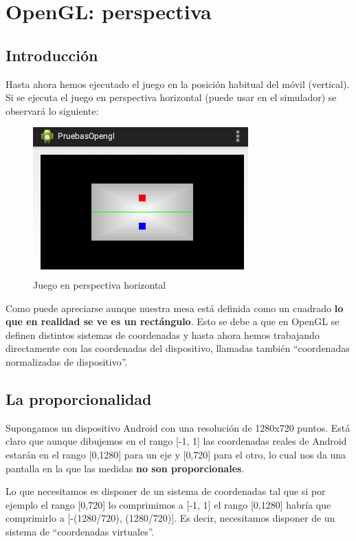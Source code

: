 \documentclass[a4paper,12pt,spanish]{sphinxmanual}
\begin{document}
\chapter{OpenGL: perspectiva}
\label{cap5opengl::doc}\label{cap5opengl:opengl-perspectiva}

\section{Introducción}
\label{cap5opengl:introduccion}
Hasta ahora hemos ejecutado el juego en la posición habitual del móvil (vertical). Si se ejecuta el juego en perspectiva horizontal (puede usar  en el simulador) se observará lo siguiente:
\begin{figure}[htbp]
\centering
\capstart

\includegraphics{juegohorizontal.png}
\caption{Juego en perspectiva horizontal}\end{figure}

Como puede apreciarse aunque nuestra mesa está definida como un cuadrado \textbf{lo que en realidad se ve es un rectángulo}. Esto se debe a que en OpenGL se definen distintos sistemas de coordenadas y hasta ahora hemos trabajando directamente con las coordenadas del dispositivo, llamadas también ``coordenadas normalizadas de dispositivo''.


\section{La proporcionalidad}
\label{cap5opengl:la-proporcionalidad}
Supongamos un dispositivo Android con una resolución de 1280x720 puntos. Está claro que aunque dibujemos en el rango {[}-1, 1{]} las coordenadas reales de Android estarán en el rango  {[}0,1280{]} para un eje y {[}0,720{]} para el otro, lo cual nos da una pantalla en la que las medidas \textbf{no son proporcionales}.

Lo que necesitamos es disponer de un sistema de coordenadas tal que si por ejemplo el rango {[}0,720{]} lo comprimimos a {[}-1, 1{]} el rango {[}0,1280{]} habría que comprimirlo a {[}-(1280/720), (1280/720){]}. Es decir, necesitamos disponer de un sistema de ``coordenadas virtuales''.
\end{document}
